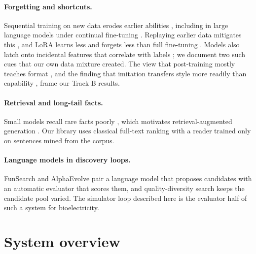 \documentclass[11pt]{article}
\begin{document}
\paragraph{Forgetting and shortcuts.} Sequential training on new data
erodes earlier abilities
\citep{mccloskey1989catastrophic,kirkpatrick2017overcoming}, including
in large language models under continual fine-tuning \citep{luo2023empirical}.
Replaying earlier data mitigates this \citep{ibrahim2024simple}, and LoRA
\citep{hu2022lora} learns less and forgets less than full fine-tuning
\citep{biderman2024lora}. Models also latch onto incidental features that
correlate with labels \citep{gururangan2018annotation,geirhos2020shortcut};
we document two such cues that our own data mixture created. The view that
post-training mostly teaches format \citep{zhou2023lima}, and the finding
that imitation transfers style more readily than capability
\citep{gudibande2023false}, frame our Track B results.

\paragraph{Retrieval and long-tail facts.} Small models recall rare facts
poorly \citep{kandpal2023large,mallen2023when}, which motivates
retrieval-augmented generation \citep{lewis2020retrieval}. Our library
uses classical full-text ranking \citep{robertson2009probabilistic} with a
reader trained only on sentences mined from the corpus.

\paragraph{Language models in discovery loops.} FunSearch
\citep{romera2024mathematical} and AlphaEvolve \citep{novikov2025alphaevolve}
pair a language model that proposes candidates with an automatic evaluator
that scores them, and quality-diversity search \citep{mouret2015illuminating}
keeps the candidate pool varied. The simulator loop described here is the
evaluator half of such a system for bioelectricity.

\section{System overview}
\end{document}
